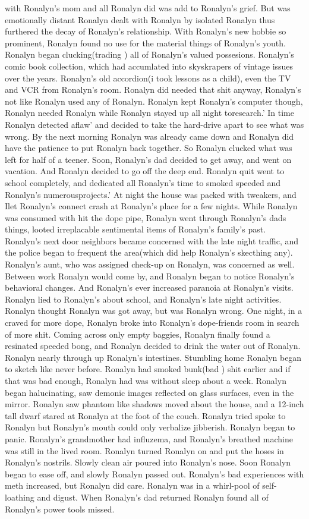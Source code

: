 \documentclass[12pt]{book}
\begin{document}
with Ronalyn's mom and all Ronalyn did was add to Ronalyn's grief. But was emotionally distant Ronalyn dealt with Ronalyn by isolated Ronalyn thus furthered the decay of Ronalyn's relationship. With Ronalyn's new hobbie so prominent, Ronalyn found no use for the material things of Ronalyn's youth. Ronalyn began clucking(trading ) all of Ronalyn's valued possesions. Ronalyn's comic book collection, which had accumlated into skyskrapers of vintage issues over the years. Ronalyn's old accordion(i took lessons as a child), even the TV and VCR from Ronalyn's room. Ronalyn did needed that shit anyway, Ronalyn's not like Ronalyn used any of Ronalyn. Ronalyn kept Ronalyn's computer though, Ronalyn needed Ronalyn while Ronalyn stayed up all night toresearch.' In time Ronalyn detected aflaw' and decided to take the hard-drive apart to see what was wrong. By the next morning Ronalyn was already came down and Ronalyn did have the patience to put Ronalyn back together. So Ronalyn clucked what was left for half of a teener. Soon, Ronalyn's dad decided to get away, and went on vacation. And Ronalyn decided to go off the deep end. Ronalyn quit went to school completely, and dedicated all Ronalyn's time to smoked speeded and Ronalyn's numerousprojects.' At night the house was packed with tweakers, and Ilet Ronalyn's connect crash at Ronalyn's place for a few nights. While Ronalyn was consumed with hit the dope pipe, Ronalyn went through Ronalyn's dads things, looted irreplacable sentimental items of Ronalyn's family's past. Ronalyn's next door neighbors became concerned with the late night traffic, and the police began to frequent the area(which did help Ronalyn's skecthing any). Ronalyn's aunt, who was assigned check-up on Ronalyn, was concerned as well. Between work Ronalyn would come by, and Ronalyn began to notice Ronalyn's behavioral changes. And Ronalyn's ever increased paranoia at Ronalyn's visits. Ronalyn lied to Ronalyn's about school, and Ronalyn's late night activities. Ronalyn thought Ronalyn was got away, but was Ronalyn wrong. One night, in a craved for more dope, Ronalyn broke into Ronalyn's dope-friends room in search of more shit. Coming across only empty baggies, Ronalyn finally found a resinated speeded bong, and Ronalyn decided to drink the water out of Ronalyn. Ronalyn nearly through up Ronalyn's intestines. Stumbling home Ronalyn began to sketch like never before. Ronalyn had smoked bunk(bad ) shit earlier and if that was bad enough, Ronalyn had was without sleep about a week. Ronalyn began halucinating, saw demonic images reflected on glass surfaces, even in the mirror. Ronalyn saw phantom like shadows moved about the house, and a 12-inch tall dwarf stared at Ronalyn at the foot of the couch. Ronalyn tried spoke to Ronalyn but Ronalyn's mouth could only verbalize jibberish. Ronalyn began to panic. Ronalyn's grandmother had influzema, and Ronalyn's breathed machine was still in the lived room. Ronalyn turned Ronalyn on and put the hoses in Ronalyn's nostrils. Slowly clean air poured into Ronalyn's nose. Soon Ronalyn began to ease off, and slowly Ronalyn passed out. Ronalyn's bad experiences with meth increased, but Ronalyn did care. Ronalyn was in a whirl-pool of self-loathing and digust. When Ronalyn's dad returned Ronalyn found all of Ronalyn's power tools missed. 
\end{document}
